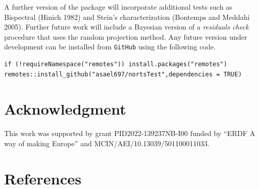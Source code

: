 A further version of the  package will incorporate additional tests such as Bispectral (Hinich 1982) and Stein's characterization (Bontemps and Meddahi 2005). Further future work will include a Bayesian version of a \emph{residuals check} procedure that uses the random projection method. Any future version under development can be installed from \texttt{GitHub} using the following code.

\begin{verbatim}
if (!requireNamespace("remotes")) install.packages("remotes")
remotes::install_github("asael697/nortsTest",dependencies = TRUE)
\end{verbatim}

\hypertarget{acknowledgment}{%
\section*{Acknowledgment}\label{acknowledgment}}

This work was supported by grant PID2022-139237NB-I00 funded by ``ERDF A way of making Europe'' and MCIN/AEI/10.13039/501100011033.

\hypertarget{references}{%
\section*{References}\label{references}}

